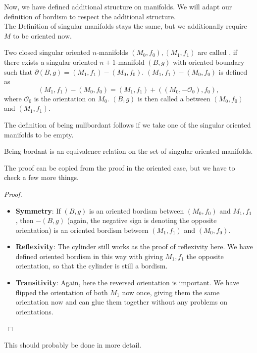 \documentclass[a4paper,11pt]{article}
\begin{document}
Now, we have defined additional structure on manifolds.
We will adapt our definition of bordism to respect the additional structure.\\
The Definition of singular manifolds stays the same, but we additionally require \(M\) to be oriented now.

\begin{definition}
    Two closed singular oriented \(n\)-manifolds \((M_0,f_0),(M_1,f_1)\) are called , if there exists a singular oriented \(n+1\)-manifold \((B,g)\) with oriented boundary such that \(\partial (B,g) = (M_1,f_1)-(M_0,f_0)\). \((M_1,f_1)-(M_0,f_0)\) is defined as
    \[(M_1,f_1)-(M_0,f_0)=(M_1,f_1)+((M_0,-\mathcal{O}_0),f_0),\]
    where \(\mathcal{O}_0\) is the orientation on \(M_0\). \((B,g)\) is then called a  between \((M_0,f_0)\) and \((M_1,f_1)\).
\end{definition}

\begin{remark}
    The definition of being nullbordant follows if we take one of the singular oriented manifolds to be empty.
\end{remark}

\begin{proposition}\label{oriented eq. rel}
    Being bordant is an equivalence relation on the set of singular oriented manifolds.
\end{proposition}

The proof can be copied from the proof in the oriented case, but we have to check a few more things.

\begin{proof}
    \begin{itemize}
        \item \textbf{Symmetry}: If \((B,g)\) is an oriented bordism between \((M_0,f_0)\) and \(M_1,f_1\), then \(-(B,g)\) (again, the negative sign is denoting the opposite orientation) is an oriented bordism between \((M_1,f_1)\) and \((M_0,f_0)\).
        \item \textbf{Reflexivity}: The cylinder still works as the proof of reflexivity here. We have defined oriented bordism in this way with giving \(M_1,f_1\) the opposite orientation, so that the cylinder is still a bordism.
        \item \textbf{Transitivity}: Again, here the reversed orientation is important. We have flipped the orientation of both \(M_1\) now once, giving them the same orientation now and can glue them together without any problems on orientations.
    \end{itemize}
\end{proof}
This should probably be done in more detail.
\end{document}
